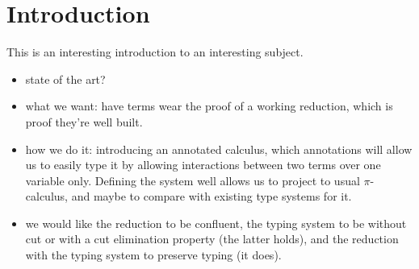 
\section*{Introduction}

This is an interesting introduction to an interesting subject. %
\begin{itemize}
	\item state of the art?
	\item what we want: have terms wear the proof of a working reduction, which is proof they're well built.
	\item how we do it: introducing an annotated calculus, which annotations will allow us to easily type it by allowing interactions between two terms over one variable only. Defining the system well allows us to project to usual $\pi$-calculus, and maybe to compare with existing type systems for it.
	\item we would like the reduction to be confluent, the typing system to be without cut or with a cut elimination property (the latter holds), and the reduction with the typing system to preserve typing (it does).
\end{itemize}
